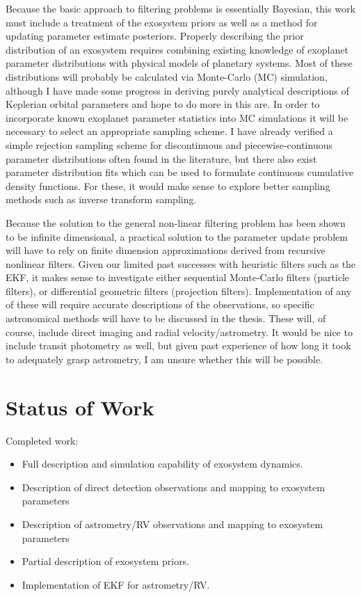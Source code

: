\documentclass[oneside,11pt]{amsart}
\begin{document}
Because the basic approach to filtering problems is essentially Bayesian, this work must include a treatment of the exosystem priors as well as a method for updating parameter estimate posteriors. Properly describing the prior distribution of an exosystem requires combining existing knowledge of exoplanet parameter distributions with physical models of planetary systems.  Most of these distributions will probably be calculated via Monte-Carlo (MC) simulation, although I have made some progress in deriving purely analytical descriptions of Keplerian orbital parameters and hope to do more in this are.  In order to incorporate known exoplanet parameter statistics into MC simulations it will be necessary to select an appropriate sampling scheme.  I have already verified a simple rejection sampling scheme for discontinuous and piecewise-continuous parameter distributions often found in the literature, but there also exist parameter distribution fits which can be used to formulate continuous cumulative density functions.  For these, it would make sense to explore better sampling methods such as inverse transform sampling.

Because the solution to the general non-linear filtering problem has been shown to be infinite dimensional, a practical solution to the parameter update problem will have to rely on finite dimension approximations derived from recursive nonlinear filters.  Given our limited past successes with heuristic filters such as the EKF, it makes sense to investigate either sequential Monte-Carlo filters (particle filters), or differential geometric filters (projection filters).  Implementation of any of these will require accurate descriptions of the observations, so specific astronomical methods will have to be discussed in the thesis.  These will, of course, include direct imaging and radial velocity/astrometry.  It would be nice to include transit photometry as well, but given past experience of how long it took to adequately grasp astrometry,  I am unsure whether this will be possible.

\section{Status of Work}
Completed work:
\begin{itemize}
\item Full description and simulation capability of exosystem dynamics.
\item Description of direct detection observations and mapping  to exosystem parameters
\item Description of astrometry/RV observations and mapping to exosystem parameters
\item Partial description of exosystem priors.
\item Implementation of EKF for astrometry/RV.
\end{itemize}
\end{document}
